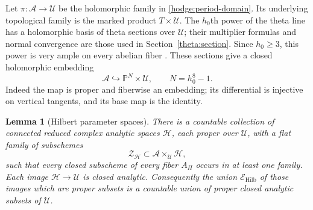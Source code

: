 \documentclass[11pt]{article}
\newtheorem{lemma}[theorem]{Lemma}
\theoremstyle{definition}
\theoremstyle{remark}
\numberwithin{equation}{section}
\begin{document}
Let $\pi:\mathscr A\to\mathcal U$ be the holomorphic family in
\eqref{hodge:period-domain}.  Its underlying topological family is the
marked product $T\times\mathcal U$.  The $h_0$th power of the theta
line has a holomorphic basis of theta sections over $\mathcal U$;
their multiplier formulas and normal convergence are those used in
Section~\ref{theta:section}.  Since $h_0\ge3$, this power is very ample
on every abelian fiber \cite{abelian-ampleness}.  These sections give a
closed holomorphic embedding
\begin{equation}
 \mathscr A\hookrightarrow\mathbb P^N\times\mathcal U,
 \qquad N=h_0^8-1.
 \label{spread:relative-embedding}
\end{equation}
Indeed the map is proper and fiberwise an embedding; its differential
is injective on vertical tangents, and its base map is the identity.

\begin{lemma}[Hilbert parameter spaces]
\label{spread:hilbert-loci}
There is a countable collection of connected reduced complex analytic
spaces $\mathcal H$, each proper over $\mathcal U$, with a flat family
of subschemes
\[
 \mathscr Z_{\mathcal H}\subset
       \mathscr A\times_{\mathcal U}\mathcal H,
\]
such that every closed subscheme of every fiber $A_\Pi$ occurs in at
least one family.  Each image $\mathcal H\to\mathcal U$ is closed
analytic.  Consequently the union $\mathcal E_{\mathrm{Hilb}}$ of
those images which are proper subsets is a countable union of proper
closed analytic subsets of $\mathcal U$.
\end{lemma}
\end{document}
